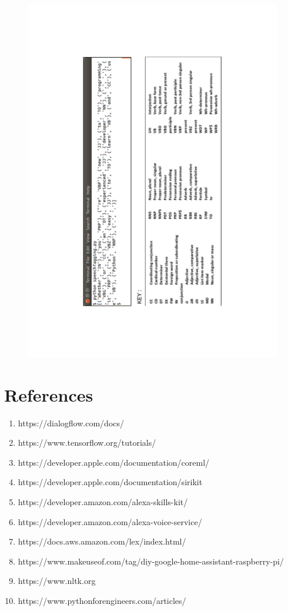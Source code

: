 \documentclass[14pt,a4paper]{article}
\begin{document}
\begin{figure}[h]
\centering
\includegraphics[scale=0.7,angle=270]{pythonNLP.pdf}
\end{figure}
\newpage
\section{References}
\begin{enumerate}
\item https://dialogflow.com/docs/
\item https://www.tensorflow.org/tutorials/
\item https://developer.apple.com/documentation/coreml/
\item https://developer.apple.com/documentation/sirikit 
\item https://developer.amazon.com/alexa-skills-kit/
\item https://developer.amazon.com/alexa-voice-service/
\item https://docs.aws.amazon.com/lex/index.html/
\item https://www.makeuseof.com/tag/diy-google-home-assistant-raspberry-pi/
\item https://www.nltk.org
\item https://www.pythonforengineers.com/articles/
\end{enumerate}
\end{document}

